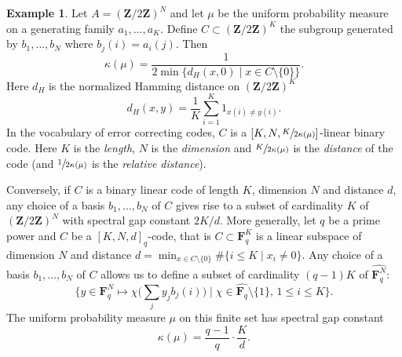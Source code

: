 \documentclass[JEP,XML,SOM,Unicode,published]{cedram}
\let\ts\textstyle
\theoremstyle{plain}
\theoremstyle{definition}
\newtheorem{example}[theorem]{Example}
\newcommand{\Z}{\mathbf{Z}}
\newcommand{\F}{\mathbf{F}}
\begin{document}
\begin{example}\label{ex:code_spectral_gap} Let $A=(\Z/2\Z)^N$ and let $\mu$ be the uniform probability measure on a generating family $a_1,\dots,a_K$. Define $C\subset (\Z/2\Z)^K$ the subgroup generated by $b_1,\dots,b_N$ where $b_j(i) = a_i(j)$. Then\vspace*{-3pt}
\begin{equation}\label{eq:relation_kappa_distance_binary} \kappa(\mu) = \frac{1}{2 \min\{ d_H(x,0) \mid x \in C\setminus\{0\}\}}.
\end{equation}
Here $d_H$ is the normalized Hamming distance on $(\Z/2\Z)^K$\vspace*{-3pt}
\[
d_H(x,y) = \frac{1}{K}\sum_{i=1}^K 1_{x(i) \neq y(i)}.
\]
In the vocabulary of error correcting codes, $C$ is a $[K,N,\sfrac{K}{2\kappa(\mu)}]$-linear binary code. Here $K$ is the \emph{length}, $N$ is the \emph{dimension} and $\sfrac{K}{2\kappa(\mu)}$ is the \emph{distance} of the code (and $\sfrac 1{2\kappa(\mu)}$ is the \emph{relative distance}).

Conversely, if $C$ is a binary linear code of length $K$, dimension $N$ and distance $d$, any choice of a basis $b_1,\dots,b_N$ of $C$ gives rise to a subset of cardinality $K$ of $(\Z/2\Z)^N$ with spectral gap constant $2K/d$. More generally, let $q$ be a prime power and $C$ be a $[K,N,d]_q$-code, that is $C\subset \F_q^K$ is a linear subspace of dimension $N$ and distance $d = \min_{x \in C\setminus \{0\}} \#\{i\leq K\mid x_i \neq 0\}$. Any choice of a basis $b_1,\dots,b_N$ of $C$ allows us to define a subset of cardinality $(q-1)K$ of $\widehat{\F_q^N}$:\vspace*{-3pt}
\[
\bigl\{ y \in \F_q^N \mapsto \chi\bigl(\ts\sum_j y_j b_j(i)\bigr) \mid \chi \in \widehat{\F_q}\setminus\{1\},\, 1\leq i\leq K\bigr\}.
\]
The uniform probability measure $\mu$ on this finite set has spectral gap constant\vspace*{-3pt}
\begin{equation}\label{eq:relation_kappa_distance_code}
\kappa(\mu) = \frac{q-1}{q}\cdot \frac{K}{d}.
\end{equation}
\end{example}
\end{document}
